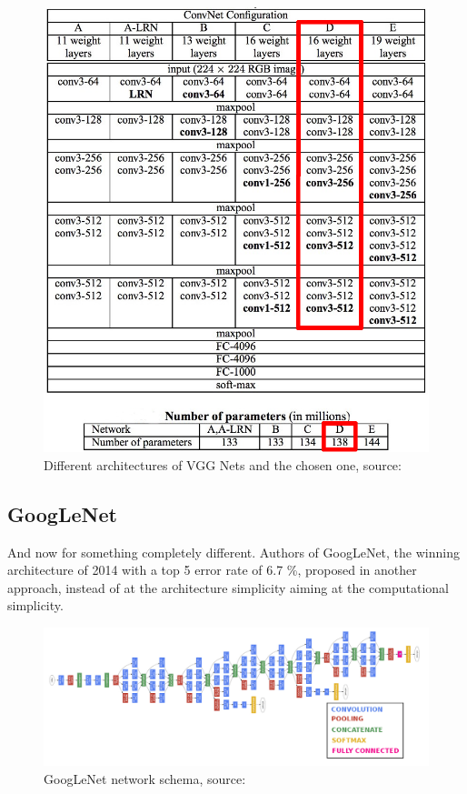 \begin{figure}[H]
   \centering
	\includegraphics[width=0.8\linewidth]{./pictures/vgg-net.png}
	\caption[VGG Net networks]{Different architectures of VGG Nets and the chosen one, source: \cite{vgg}}
      \label{fig:vgg}
\end{figure}




\subsection{GoogLeNet}
\label{googlenet}

And now for something completely different. Authors of GoogLeNet, the winning architecture of  2014 with a top 5 error rate of 6.7 \%, proposed in \cite{googlenet} another approach, instead of at the architecture simplicity aiming at the computational simplicity.

\begin{figure}[H]
   \centering
	\includegraphics[width=\linewidth]{./pictures/googlenet.png}
	\caption[GoogLeNet networks]{GoogLeNet network schema, source: \cite{googlenet}}
      \label{fig:googlenet}
\end{figure}

